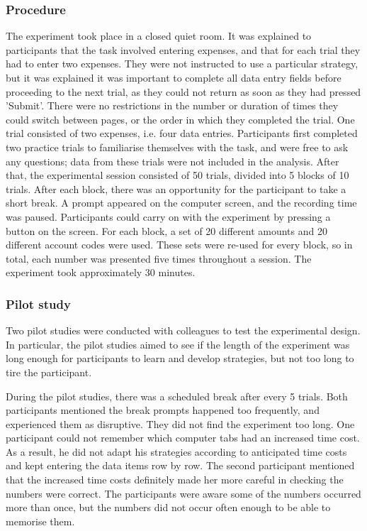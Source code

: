 \subsubsection{Procedure}
The experiment took place in a closed quiet room. It was explained to participants that the task involved entering expenses, and that for each trial they had to enter two expenses. They were not instructed to use a particular strategy, but it was explained it was important to complete all data entry fields before proceeding to the next trial, as they could not return as soon as they had pressed 'Submit'. There were no restrictions in the number or duration of times they could switch between pages, or the order in which they completed the trial. One trial consisted of two expenses, i.e. four data entries. Participants first completed two practice trials to familiarise themselves with the task, and were free to ask any questions; data from these trials were not included in the analysis. After that, the experimental session consisted of 50 trials, divided into 5 blocks of 10 trials. After each block, there was an opportunity for the participant to take a short break. A prompt appeared on the computer screen, and the recording time was paused. Participants could carry on with the experiment by pressing a button on the screen. For each block, a set of 20 different amounts and 20 different account codes were used. These sets were re-used for every block, so in total, each number was presented five times throughout a session. The experiment took approximately 30 minutes.

\subsubsection{Pilot study}
Two pilot studies were conducted with colleagues to test the experimental design. In particular, the pilot studies aimed to see if the length of the experiment was long enough for participants to learn and develop strategies, but not too long to tire the participant.

During the pilot studies, there was a scheduled break after every 5 trials. Both participants mentioned the break prompts happened too frequently, and experienced them as disruptive. They did not find the experiment too long. One participant could not remember which computer tabs had an increased time cost. As a result, he did not adapt his strategies according to anticipated time costs and kept entering the data items row by row. The second participant mentioned that the increased time costs definitely made her more careful in checking the numbers were correct. The participants were aware some of the numbers occurred more than once, but the numbers did not occur often enough to be able to memorise them. 

